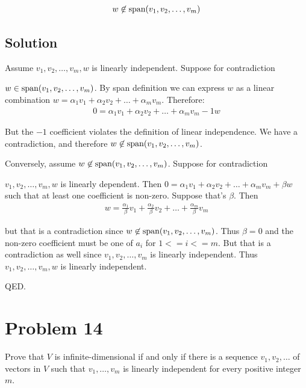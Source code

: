 \documentclass{article}
\begin{document}
\begin{align*}
    w\not\in\text{span}(v_1, v_2, \ldots, v_m)
\end{align*}

\subsection*{Solution}
Assume $v_1, v_2, \ldots, v_m, w$ is linearly independent. Suppose for contradiction

$w\in\text{span}(v_1, v_2, \ldots, v_m)$. By span definition we can express $w$ as a linear combination $w=\alpha_1 v_1 + \alpha_2 v_2 + \ldots + \alpha_m v_m$. Therefore:
\begin{align*}
0=\alpha_1 v_1 + \alpha_2 v_2 + \ldots + \alpha_m v_m -1w
\end{align*}

But the $-1$ coefficient violates the definition of linear independence. We have a contradiction, and therefore $w\not\in\text{span}(v_1, v_2, \ldots, v_m)$.

\vs

Conversely, assume $w\not\in\text{span}(v_1, v_2, \ldots, v_m)$. Suppose for contradiction

$v_1, v_2, \ldots, v_m, w$ is linearly dependent. Then $0=\alpha_1 v_1 + \alpha_2 v_2 + \ldots + \alpha_m v_m +\beta w$ such that at least one coefficient is non-zero. Suppose that's $\beta$. Then
\begin{align*}
    w=\frac{\alpha_1}{\beta} v_1 + \frac{\alpha_2}{\beta} v_2 + \ldots + \frac{\alpha_m}{\beta} v_m
\end{align*}

but that is a contradiction since $w\not\in\text{span}(v_1, v_2, \ldots, v_m)$. Thus $\beta=0$ and the non-zero coefficient must be one of $a_i$ for $1 <= i <= m$. But that is a contradiction as well since $v_1, v_2, \ldots, v_m$ is linearly independent. Thus $v_1, v_2, \ldots, v_m, w$ is linearly independent.

\vs

QED.

\section*{Problem 14}
Prove that $V$ is infinite-dimensional if and only if there is a sequence $v_1, v_2, \ldots$ of vectors in $V$ such that $v_1,\ldots,v_m$ is linearly independent for every positive integer $m$.
\end{document}
